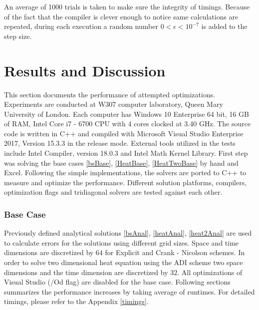 \documentclass[12pt, oneside]{book}
\theoremstyle{plain}
\theoremstyle{definition}
\begin{document}
An average of 1000 trials is taken to make sure the integrity of timings. Because of the fact that the compiler is clever enough to notice same calculations are repeated, during each execution a random number $ 0 < \epsilon < 10^{-7} $ is added to the step size. 

\chapter{Results and Discussion}
This section documents the performance of attempted optimizations. Experiments are conducted at W307 computer laboratory, Queen Mary University of London. Each computer has Windows 10 Enterprise 64 bit, 16 GB of RAM, Intel Core i7 - 6700 CPU with 4 cores clocked at 3.40 GHz. The source code is written in C++ and compiled with Microsoft Visual Studio Enterprise 2017, Version 15.3.3 in the release mode. External tools utilized in the tests include Intel Compiler, version 18.0.3 and Intel Math Kernel Library. First step was solving the base cases \ref{bsBase}, \ref{HeatBase}, \ref{HeatTwoBase} by hand and Excel. Following the simple implementations, the solvers are ported to C++ to measure and optimize the performance. Different solution platforms, compilers, optimization flags and tridiagonal solvers are tested against each other.
 
\subsection{Base Case}
Previously defined analytical solutions \ref{bsAnal}, \ref{heatAnal}, \ref{heat2Anal} are used to calculate errors for the solutions using different grid sizes. Space and time dimensions are discretized by $64$ for Explicit and Crank - Nicolson schemes. In order to solve two dimensional heat equation using the ADI scheme two space dimensions and the time dimension are discretized by $32$.  All optimizations of Visual Studio  (/Od flag) are disabled for the base case. Following sections summarizes the performance increases by taking average of runtimes. For detailed timings, please refer to the Appendix \ref{timings}.
\end{document}
